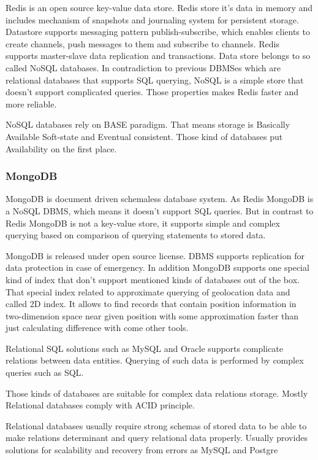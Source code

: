 \documentclass[thesis=M,english]{FITthesis}[2012/10/20]
\begin{document}
Redis is an open source key-value data store. Redis store it's data in memory and includes mechanism of snapshots and journaling system for persistent storage. Datastore supports messaging pattern publish-subscribe, which enables clients to create channels, push messages to them and  subscribe to channels.
Redis supports master-slave data replication and transactions. Data store belongs to so called NoSQL databases. In contradiction to previous DBMSes which are relational databases that supports SQL querying, NoSQL is a simple store that doesn't support complicated queries. Those properties makes Redis faster and more reliable.

NoSQL databases rely on BASE paradigm. That means storage is Basically Available Soft-state and Eventual consistent. Those kind of databases put Availability on the first place.

\subsubsection{MongoDB}

MongoDB is document driven schemaless database system. As Redis MongoDB is a NoSQL DBMS, which means it doesn't support SQL queries. But in contrast to Redis MongoDB is not a key-value store, it supports simple and complex querying based on comparison of querying statements to stored data.

MongoDB is released under open source license. DBMS supports replication for data protection in case of emergency. 
In addition MongoDB supports one special kind of index that don't support mentioned kinds of databases out of the box. That special index related to approximate querying of geolocation data and called 2D index. It allows to find records that contain position information in two-dimension space near given position with some approximation faster than just calculating difference with come other tools.

Relational SQL solutions such as MySQL and Oracle supports complicate relations between data entities. Querying of such data is performed by complex queries such as SQL.

Those kinds of databases are suitable for complex data relations storage.
Mostly Relational databases comply with ACID principle.

Relational databases usually require strong schemas of stored data to be able to make relations determinant and query relational data properly.
Usually provides solutions for scalability and recovery from errors as MySQL and Postgre
\end{document}
